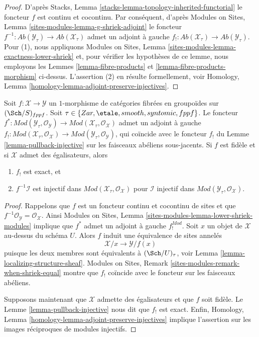\begin{proof}
D'après
Stacks, Lemma \ref{stacks-lemma-topology-inherited-functorial}
le foncteur $f$ est continu et cocontinu. Par conséquent, d'après
Modules on Sites, Lemma \ref{sites-modules-lemma-g-shriek-adjoint}
le foncteur
$f^{-1} : \textit{Ab}(\mathcal{Y}_\tau) \to \textit{Ab}(\mathcal{X}_\tau)$
admet un adjoint à gauche
$f_! : \textit{Ab}(\mathcal{X}_\tau) \to \textit{Ab}(\mathcal{Y}_\tau)$.
Pour (1), nous appliquons
Modules on Sites, Lemma \ref{sites-modules-lemma-exactness-lower-shriek}
et, pour vérifier les hypothèses de ce lemme, nous employons les
Lemmes \ref{lemma-fibre-products} et
\ref{lemma-fibre-products-morphism}
ci-dessus. L'assertion (2) en résulte formellement, voir
Homology, Lemma \ref{homology-lemma-adjoint-preserve-injectives}.
\end{proof}

\begin{lemma}
\label{lemma-pullback-injective-modules}
Soit $f : \mathcal{X} \to \mathcal{Y}$ un $1$-morphisme de catégories
fibrées en groupoïdes sur $(\Sch/S)_{fppf}$. Soit
$\tau \in \{Zar, \etale, smooth, syntomic, fppf\}$.
Le foncteur
$f^* : \textit{Mod}(\mathcal{Y}_\tau, \mathcal{O}_\mathcal{Y}) \to
\textit{Mod}(\mathcal{X}_\tau, \mathcal{O}_\mathcal{X})$
admet un adjoint à gauche
$f_! : \textit{Mod}(\mathcal{X}_\tau, \mathcal{O}_\mathcal{X}) \to
\textit{Mod}(\mathcal{Y}_\tau, \mathcal{O}_\mathcal{Y})$, qui
coïncide avec le foncteur $f_!$ du Lemme \ref{lemma-pullback-injective}
sur les faisceaux abéliens sous-jacents.
Si $f$ est fidèle et si $\mathcal{X}$ admet des égalisateurs, alors
\begin{enumerate}
\item $f_!$ est exact, et
\item $f^{-1}\mathcal{I}$ est injectif dans
$\textit{Mod}(\mathcal{X}_\tau, \mathcal{O}_\mathcal{X})$
pour $\mathcal{I}$ injectif dans
$\textit{Mod}(\mathcal{Y}_\tau, \mathcal{O}_\mathcal{X})$.
\end{enumerate}
\end{lemma}

\begin{proof}
Rappelons que $f$ est un foncteur continu et cocontinu de sites
et que $f^{-1}\mathcal{O}_\mathcal{Y} = \mathcal{O}_\mathcal{X}$. Ainsi
Modules on Sites, Lemma \ref{sites-modules-lemma-lower-shriek-modules}
implique que $f^*$ admet un adjoint à gauche $f_!^{Mod}$.
Soit $x$ un objet de $\mathcal{X}$ au-dessus du schéma $U$.
Alors $f$ induit une équivalence de sites annelés
$$
\mathcal{X}/x \longrightarrow \mathcal{Y}/f(x)
$$
puisque les deux membres sont équivalents à $(\Sch/U)_\tau$, voir
Lemma \ref{lemma-localizing-structure-sheaf}.
Modules on Sites, Remark \ref{sites-modules-remark-when-shriek-equal}
montre que $f_!$ coïncide avec le foncteur sur les faisceaux abéliens.

\medskip\noindent
Supposons maintenant que $\mathcal{X}$ admette des égalisateurs et que $f$ soit fidèle.
Le Lemme \ref{lemma-pullback-injective}
nous dit que $f_!$ est exact. Enfin,
Homology, Lemma \ref{homology-lemma-adjoint-preserve-injectives}
implique l'assertion sur les images réciproques de modules injectifs.
\end{proof}




